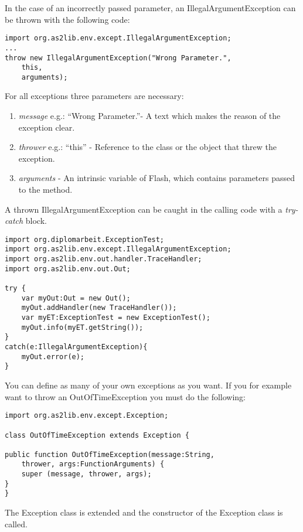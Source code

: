 In the case of an incorrectly passed parameter, an IllegalArgumentException can be thrown with the following code:

\begin{lstlisting}[frame=single]
import org.as2lib.env.except.IllegalArgumentException;
...
throw new IllegalArgumentException("Wrong Parameter.",
	this,
	arguments);
\end{lstlisting}
For all exceptions three parameters are necessary:
\begin{enumerate}
	\item \emph{message} e.g.: ``Wrong Parameter.''- A text which makes the reason of the exception clear.
	\item \emph{thrower} e.g.: ``this'' - Reference to the class or the object that threw the exception.
	\item \emph{arguments} - An intrinsic variable of Flash, which contains parameters passed to the method.
\end{enumerate}
A thrown IllegalArgumentException can be caught in the calling code with a \emph{try-catch} block.
\begin{lstlisting}[frame=single]
import org.diplomarbeit.ExceptionTest;
import org.as2lib.env.except.IllegalArgumentException;
import org.as2lib.env.out.handler.TraceHandler;
import org.as2lib.env.out.Out;

try {
	var myOut:Out = new Out();
	myOut.addHandler(new TraceHandler());
	var myET:ExceptionTest = new ExceptionTest();
	myOut.info(myET.getString());
}
catch(e:IllegalArgumentException){
	myOut.error(e);
}
\end{lstlisting}

You can define as many of your own exceptions as you want. If you for example want to throw an OutOfTimeException you must do the following:
\clearpage
\begin{lstlisting}[frame=single]
import org.as2lib.env.except.Exception;

class OutOfTimeException extends Exception {

public function OutOfTimeException(message:String,
	thrower, args:FunctionArguments) {
	super (message, thrower, args);
}
}
\end{lstlisting}
The Exception class is extended and the constructor of the Exception class is called.